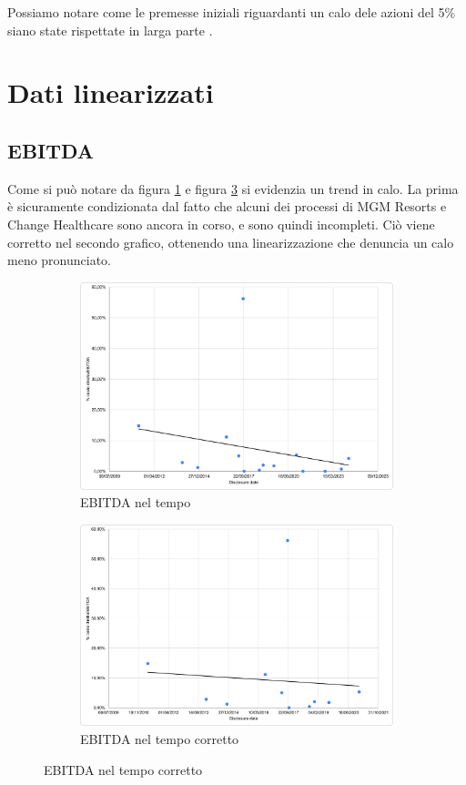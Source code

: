 \documentclass[12pt,a4paper,openright,twoside]{report}
\begin{document}
Possiamo notare come le premesse iniziali riguardanti un calo dele azioni del 5\% siano state rispettate in larga parte \cite{accenture2010}.\\

\section{Dati linearizzati}
\subsection{EBITDA}
Come si pu\`o notare da figura \ref{fig:ebit1} e figura \ref{fig:ebit2} si evidenzia un trend in calo. La prima \`e sicuramente condizionata dal fatto che alcuni dei processi di MGM Resorts e Change Healthcare sono ancora in corso, e sono quindi incompleti. Ci\`o viene corretto nel secondo grafico, ottenendo una linearizzazione che denuncia un calo meno pronunciato.\\
\begin{figure}[H]
    \centering
    \begin{subfigure}{0.48\textwidth}
        \centering
        \includegraphics[width=1\linewidth]{figures/ebit-date-1.png}
        \caption{EBITDA nel tempo}
        \label{fig:ebit1}
    \end{subfigure}
    \begin{subfigure}{0.48\textwidth}
        \centering
    \includegraphics[width=1\linewidth]{figures/ebit-date-2.png}
    \caption{EBITDA nel tempo corretto}
    \label{fig:ebit2}
    \end{subfigure}
\end{figure}
\end{document}
